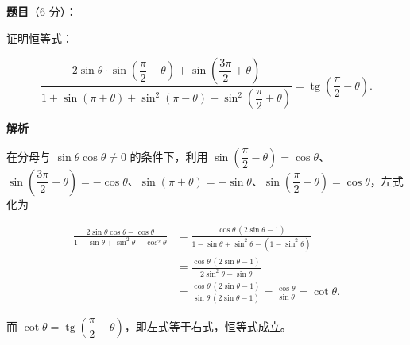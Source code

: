 \begin{answer}

\textbf{题目}（6 分）：

证明恒等式：

\nopagebreak[4]
\[
\frac{2\sin\theta\cdot\sin\left(\dfrac{\pi}{2}-\theta\right)+\sin\left(\dfrac{3\pi}{2}+\theta\right)}
{1+\sin(\pi+\theta)+\sin^2(\pi-\theta)-\sin^2\left(\dfrac{\pi}{2}+\theta\right)}
=\operatorname{tg}\left(\dfrac{\pi}{2}-\theta\right).
\]

\textbf{解析}

在分母与 $\sin\theta\cos\theta\ne0$ 的条件下，利用 $\sin\left(\dfrac{\pi}{2}-\theta\right)=\cos\theta$、$\sin\left(\dfrac{3\pi}{2}+\theta\right)=-\cos\theta$、$\sin(\pi+\theta)=-\sin\theta$、$\sin\left(\dfrac{\pi}{2}+\theta\right)=\cos\theta$，左式化为

\nopagebreak[4]
\[
\begin{aligned}
\frac{2\sin\theta\cos\theta-\cos\theta}{1-\sin\theta+\sin^2\theta-\cos^2\theta}
&=\frac{\cos\theta\,(2\sin\theta-1)}{1-\sin\theta+\sin^2\theta-(1-\sin^2\theta)}\\
&=\frac{\cos\theta\,(2\sin\theta-1)}{2\sin^2\theta-\sin\theta}\\
&=\frac{\cos\theta\,(2\sin\theta-1)}{\sin\theta\,(2\sin\theta-1)}
=\frac{\cos\theta}{\sin\theta}=\cot\theta.
\end{aligned}
\]

而 $\cot\theta=\operatorname{tg}\left(\dfrac{\pi}{2}-\theta\right)$，即左式等于右式，恒等式成立。


\end{answer}
